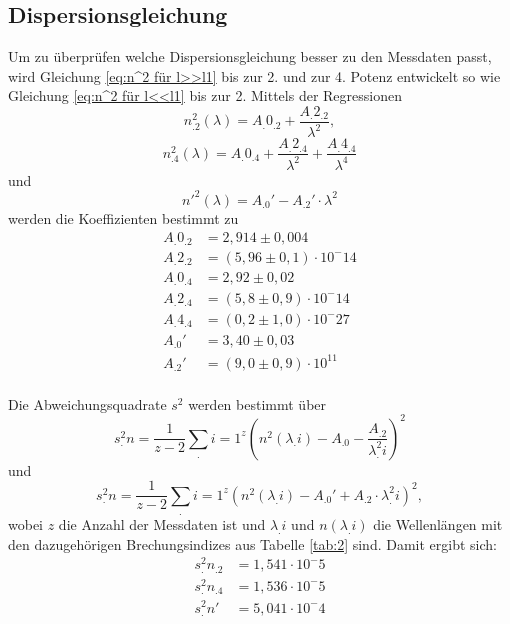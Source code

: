 \subsection{Dispersionsgleichung}
\label{sec:Dispersion}
Um zu überprüfen welche Dispersionsgleichung besser zu den Messdaten passt, wird Gleichung \eqref{eq:n^2 für l>>l1} bis zur 2. und zur 4. Potenz entwickelt so wie Gleichung \eqref{eq:n^2 für l<<l1} bis zur 2. 
Mittels der Regressionen
\begin{equation}
n^2_.2 (\lambda)=A_.{0_.2}+\frac{A_.{2_.2}}{\lambda^2},\label{eq:reg2}
\end{equation}
\begin{equation}
n^2_.4 (\lambda)=A_.{0_.4}+\frac{A_.{2_.4}}{\lambda^2}+\frac{A_.{4_.4}}{\lambda^4}\label{eq:reg4}
\end{equation}
und
\begin{equation}
n'^2(\lambda)=A_.0'-A_.2'\cdot \lambda^2\label{eq:reg'}
\end{equation}
werden die Koeffizienten bestimmt zu
\begin{align*}
A_.{0_.2}&= 2,914\pm 0,004 \\
A_.{2_.2}&= (5,96\pm 0,1)\cdot 10^-14 \\
A_.{0_.4}&= 2,92\pm 0,02 \\
A_.{2_.4}&= (5,8\pm 0,9)\cdot 10^-14 \\
A_.{4_.4}&= (0,2\pm 1,0)\cdot 10^-27 \\
A_.0'  &= 3,40\pm 0,03 \\
A_.2'  &= (9,0\pm 0,9)\cdot 10^11 \\
\end{align*}

Die Abweichungsquadrate $s^2$ werden bestimmt über 
\begin{equation}
s^2_.n = \frac{1}{z-2}\sum_.{i=1}^z \left(n^2(\lambda_.i)-A_.0-\frac{A_.2}{\lambda^2_.i}\right)^2
\end{equation}
und
\begin{equation}
s^2_.n = \frac{1}{z-2}\sum_.{i=1}^z \left(n^2(\lambda_.i)-A_.0' +A_.2\cdot\lambda^2_.i\right)^2,
\end{equation}
wobei $z$ die Anzahl der Messdaten ist und $\lambda_.i$ und $n(\lambda_.i)$ die Wellenlängen mit den dazugehörigen Brechungsindizes aus Tabelle \ref{tab:2} sind.
Damit ergibt sich:
\begin{align*}
s^2_.{n_.2}&=1,541\cdot 10^-5 \\
s^2_.{n_.4}&=1,536\cdot 10^-5 \\
s^2_.{n'}&=5,041\cdot 10^-4 \\
\end{align*}

